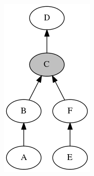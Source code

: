 \begin{figure}[H]
{\begin{subfigure}[b]{0.2\textwidth}
            \caption{}\label{fig:network_events_locations_examples_1}
        \end{subfigure}
        \begin{subfigure}[b]{0.2\textwidth}
            \includegraphics[width=\textwidth]{./figures/methodology/spatial_time_correlation/graph2.png}

\end{subfigure}}
\end{figure}
